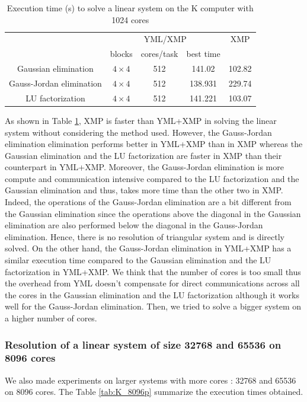 \begin{table}[h]
	\caption{Execution time (s) to solve a linear system on the K computer with 1024 cores\label{tab:K_1024p_16384n}}
	\centering
	\begin{tabular}{ccccc}
		                         &      \multicolumn{3}{c}{YML/XMP}      &  XMP   \\
		                         &    blocks    & cores/task & best time &        \\ \hline
		  Gaussian elimination   & $4 \times 4$ &    512     &  141.02   & 102.82 \\
		Gauss-Jordan elimination & $4 \times 4$ &    512     &  138.931  & 229.74 \\
		    LU factorization     & $4 \times 4$ &    512     &  141.221  & 103.07
	\end{tabular}
\end{table}


As shown in Table \ref{tab:K_1024p_16384n}, XMP is faster than YML+XMP in solving the linear system without considering the method used.
However, the Gauss-Jordan elimination elimination performs better in YML+XMP than in XMP whereas the Gaussian elimination and the LU factorization are faster in XMP than their counterpart in YML+XMP.
Moreover, the Gauss-Jordan elimination is more compute and communication intensive compared to the LU factorization and the Gaussian elimination and thus, takes more time than the other two in XMP.
Indeed, the operations of the Gauss-Jordan elimination are a bit different from the Gaussian elimination since the operations above the diagonal in the Gaussian elimination are also performed below the diagonal in the Gauss-Jordan elimination.
Hence, there is no resolution of triangular system and is directly solved.
On the other hand, the Gauss-Jordan elimination in YML+XMP has a similar execution time compared to the Gaussian elimination and the LU factorization in YML+XMP.
We think that the number of cores is too small thus the overhead from YML doesn't compensate for direct communications across all the cores in the Gaussian elimination and the LU factorization although it works well for the Gauss-Jordan elimination.
Then, we tried to solve a bigger system on a higher number of cores.


\subsubsection{Resolution of a linear system of size 32768 and 65536 on 8096 cores}
We also made experiments on larger systems with more cores : 32768 and 65536 on 8096 cores.
The Table \ref{tab:K_8096p} summarize the execution times obtained.

